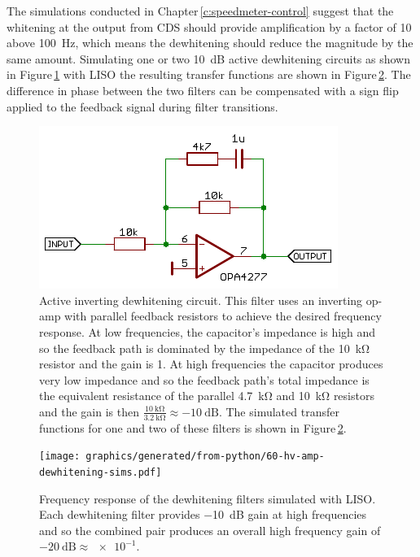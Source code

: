 The simulations conducted in Chapter\,\ref{c:speedmeter-control} suggest that the whitening at the output from \gls{CDS} should provide amplification by a factor of \num{10} above \SI{100}{\hertz}, which means the dewhitening should reduce the magnitude by the same amount. Simulating one or two \SI{10}{\deci\bel} active dewhitening circuits as shown in Figure\,\ref{fig:hv-amp-dewhitening-circuit} with \gls{LISO} the resulting transfer functions are shown in Figure\,\ref{fig:hv-amp-dewhitening-sims}. The difference in phase between the two filters can be compensated with a sign flip applied to the feedback signal during filter transitions.

\begin{figure}
  \centering
  \includegraphics[width=\columnwidth]{graphics/60-hv-amp-dewhitening.pdf}
  \caption[Active inverting dewhitening circuit]{Active inverting dewhitening circuit. This filter uses an inverting op-amp with parallel feedback resistors to achieve the desired frequency response. At low frequencies, the capacitor's impedance is high and so the feedback path is dominated by the impedance of the \SI{10}{\kilo\ohm} resistor and the gain is \num{1}. At high frequencies the capacitor produces very low impedance and so the feedback path's total impedance is the equivalent resistance of the parallel \SI{4.7}{\kilo\ohm} and \SI{10}{\kilo\ohm} resistors and the gain is then $\frac{\SI{10}{\kilo\ohm}}{\SI{3.2}{\kilo\ohm}} \approx \SI{-10}{\deci\bel}$. The simulated transfer functions for one and two of these filters is shown in Figure\,\ref{fig:hv-amp-dewhitening-sims}.}
  \label{fig:hv-amp-dewhitening-circuit}
\end{figure}

\begin{figure}
  \centering
  \texttt{[image: graphics/generated/from-python/60-hv-amp-dewhitening-sims.pdf]}
  \caption[Simulated dewhitening filter frequency response]{Frequency response of the dewhitening filters simulated with \gls{LISO}. Each dewhitening filter provides \SI{-10}{\deci\bel} gain at high frequencies and so the combined pair produces an overall high frequency gain of $\SI{-20}{\deci\bel} \approx \num{e-1}$.}
  \label{fig:hv-amp-dewhitening-sims}
\end{figure}

